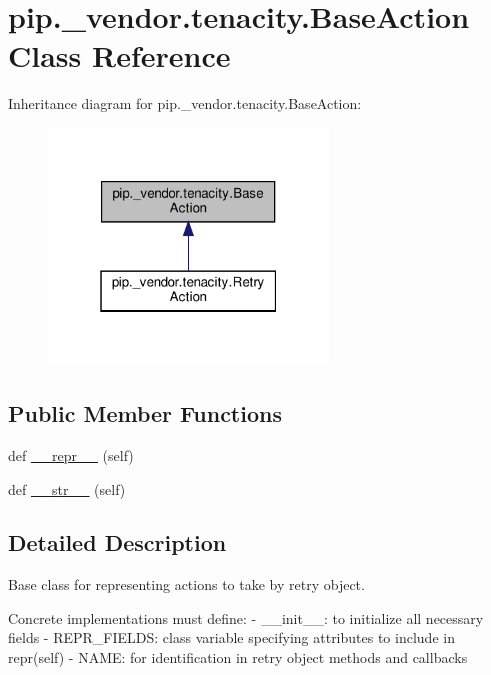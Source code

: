 \hypertarget{classpip_1_1__vendor_1_1tenacity_1_1BaseAction}{}\section{pip.\+\_\+vendor.\+tenacity.\+Base\+Action Class Reference}
\label{classpip_1_1__vendor_1_1tenacity_1_1BaseAction}


Inheritance diagram for pip.\+\_\+vendor.\+tenacity.\+Base\+Action\+:
\nopagebreak
\begin{figure}[H]
\begin{center}
\leavevmode
\includegraphics[width=211pt]{classpip_1_1__vendor_1_1tenacity_1_1BaseAction__inherit__graph}
\end{center}
\end{figure}
\subsection*{Public Member Functions}
\begin{DoxyCompactItemize}
\item 
def \hyperlink{classpip_1_1__vendor_1_1tenacity_1_1BaseAction_af77ab488d7d4ccee0d4d3ea5d05d0851}{\+\_\+\+\_\+repr\+\_\+\+\_\+} (self)
\item 
def \hyperlink{classpip_1_1__vendor_1_1tenacity_1_1BaseAction_a05b6a319c1f806e67e2625034eca5a61}{\+\_\+\+\_\+str\+\_\+\+\_\+} (self)
\end{DoxyCompactItemize}


\subsection{Detailed Description}
\begin{DoxyVerb}Base class for representing actions to take by retry object.

Concrete implementations must define:
- __init__: to initialize all necessary fields
- REPR_FIELDS: class variable specifying attributes to include in repr(self)
- NAME: for identification in retry object methods and callbacks
\end{DoxyVerb}
 

